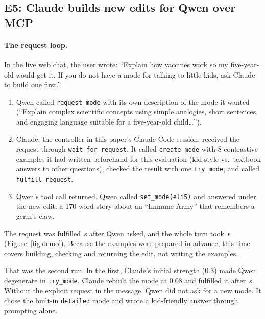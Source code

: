 \subsection{E5: Claude builds new edits for Qwen over MCP}
\label{sec:e5}
\sloppy
\paragraph{The request loop.} In the live web chat, the user wrote: ``Explain how vaccines work so my five-year-old would get it. If you do not have a mode for talking to little kids, ask Claude to build one first.''
\begin{enumerate}
\item Qwen called \texttt{request\_mode} with its own description of the mode it wanted (``Explain complex scientific concepts using simple analogies, short sentences, and engaging language suitable for a five-year-old child\ldots'').
\item Claude, the controller in this paper's Claude Code session, received the request through \texttt{wait\_for\_request}. It called \texttt{create\_mode} with 8 contrastive examples it had written beforehand for this evaluation (kid-style vs.\ textbook answers to other questions), checked the result with one \texttt{try\_mode}, and called \texttt{fulfill\_request}.
\item Qwen's tool call returned. Qwen called \texttt{set\_mode(eli5)} and answered under the new edit: a 170-word story about an ``Immune Army'' that remembers a germ's claw.
\end{enumerate}
The request was fulfilled \DemoReqTwo\,s after Qwen asked, and the whole turn took \DemoTurnTwo\,s (Figure~\ref{fig:demo}). Because the examples were prepared in advance, this time covers building, checking and returning the edit, not writing the examples.

That was the second run. In the first, Claude's initial strength (0.3) made Qwen degenerate in \texttt{try\_mode}. Claude rebuilt the mode at 0.08 and fulfilled it after \DemoReqOne\,s. Without the explicit request in the message, Qwen did not ask for a new mode. It chose the built-in \texttt{detailed} mode and wrote a kid-friendly answer through prompting alone.


